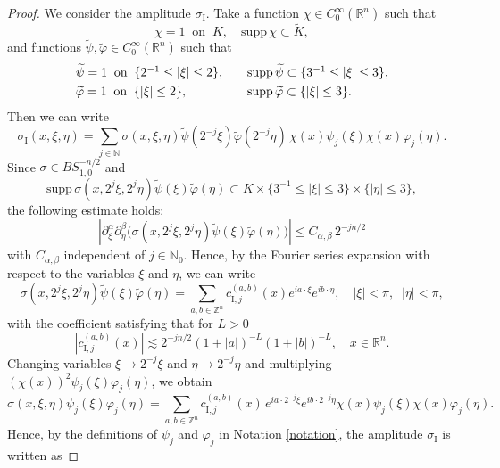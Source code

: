 \documentclass[12pt]{amsart}
\numberwithin{equation}{section}
\theoremstyle{plain}
\theoremstyle{definition}
\newcommand{\N}{\mathbb{N}}
\newcommand{\R}{\mathbb{R}}
\newcommand{\Z}{\mathbb{Z}}
\newcommand{\supp}{\mathrm{supp}\, }
\newcommand{\RomI}{\mathrm{I}}
\begin{document}
\begin{proof}
We consider the amplitude $\sigma_{\RomI}$. 
Take
a function $\chi \in C_{0}^{\infty}(\R^n)$ such that
\[
\chi = 1 \;\;\text{on}\;\; K,
\quad
\supp \chi 
\subset \widetilde{K} ,
\]
and functions 
$\widetilde{\psi}, \widetilde{\varphi} \in C_{0}^{\infty}(\R^n)$ 
such that 
\[\begin{array}{ll}
\widetilde{\psi} = 1 
\;\;\text{on}\;\; \{ 2^{-1}\le |\xi| \le 2 \}, \quad
&
\supp \widetilde{\psi} 
\subset \{3^{-1}\le |\xi| \le 3\}, 
\vspace{3pt}\\
\widetilde{\varphi} = 1 
\;\;\text{on}\;\; \{ |\xi| \le 2 \}, \quad
&
\supp \widetilde{\varphi} 
\subset \{|\xi| \le 3\} .
\end{array}\]
Then we can write
\[
\sigma_{\RomI}(x, \xi, \eta)
=
\sum_{j \in \N }
\sigma (x, \xi, \eta) 
\widetilde{\psi}(2^{-j}\xi) 
\widetilde{\varphi}(2^{-j}\eta) \,
\chi(x) \psi_{j} (\xi) 
\chi(x) \varphi_{j} (\eta). 
\]
Since $\sigma \in BS_{1,0}^{-n/2}$ and
\[
\supp \sigma (x, 2^{j} \xi, 2^{j}\eta)\widetilde{\psi}(\xi) 
\widetilde{\varphi}(\eta)
\subset 
K \times 
\{3^{-1}\le |\xi|\le 3\}\times 
\{|\eta|\le 3\},
\]
the following estimate holds:
\begin{equation*}
\left|
\partial^{\alpha}_{\xi} 
\partial^{\beta}_{\eta} 
\big(
\sigma (x, 2^{j} \xi, 2^{j}\eta)\widetilde{\psi}(\xi) 
\widetilde{\varphi}(\eta)
\big) 
\right| 
\le 
C_{\alpha, \beta}\,  2^{-j n/2}
\end{equation*}
with $C_{\alpha, \beta}$ independent of $j\in \N_0$. 
Hence, by the Fourier series expansion
with respect to the variables $\xi$ and $\eta$, 
we can write 
\[
\sigma (x, 2^{j} \xi, 2^{j}\eta)\widetilde{\psi}(\xi) 
\widetilde{\varphi}(\eta)
=
\sum_{a, b \in \Z^n} 
c_{\RomI, j}^{(a, b)} (x)
e^{i a \cdot \xi} e^{i b \cdot \eta}, 
\quad 
|\xi|<\pi, \;\; |\eta|<\pi,  
\]
with the coefficient satisfying that
for $L>0$
\begin{equation} \label{cjab-decay}
| c_{\RomI, j}^{(a, b)} (x) | 
\lesssim 2^{-j n/2} 
(1+|a|)^{-L} (1+|b|)^{-L},
\quad
x \in \R^n.
\end{equation}
Changing variables 
$\xi \to 2^{-j}\xi$ and $\eta \to 2^{-j}\eta$
and 
multiplying $(\chi(x))^2 \psi_{j} (\xi) \varphi_{j} (\eta)$, 
we obtain 
\[
\sigma (x, \xi, \eta)
\psi_{j} (\xi) 
\varphi_{j} (\eta)
=
\sum_{a, b \in \Z^n} 
c_{\RomI, j}^{(a, b)} (x) \,
e^{i a \cdot 2^{-j} \xi} e^{i b \cdot 2^{-j}\eta}
\chi(x) \psi_{j} (\xi) \chi(x) \varphi_{j} (\eta).  
\]
Hence, by the definitions of
$\psi_{j}$ and $\varphi_{j}$
in Notation \ref{notation}, 
the amplitude $\sigma_{\RomI}$ is written as

\end{proof}
\end{document}
